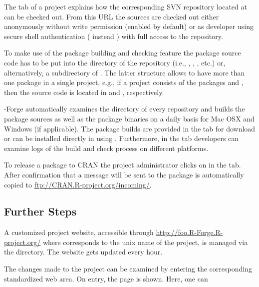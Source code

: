The  tab of a project explains how the corresponding SVN
repository located at 
can be checked out. From
this URL the sources are checked out either 
anonymously without write permission (enabled by default) or as
developer using secure shell 
authentication ( instead ) with full
access to the repository.

To make use of the package building and checking feature
the package source code has to be put into the  directory
of the repository (i.e., ,
, , etc.) or, alternatively, a 
subdirectory of . The latter structure allows to
have more than one package in a single project, e.g., if
a project consists of the packages  and , then the
source code is located in  and ,
respectively.

\R{}-Forge automatically examines the  directory of
every repository and builds the package sources as well as the package
binaries on a daily basis for Mac OSX and Windows (if applicable). The
package builds 
are provided in the  tab for download or can be
installed directly in \R{} using 
. Furthermore, in the  tab developers can examine logs of the build and check
process on different platforms. 

To release a package to CRAN the project administrator clicks on
 in the  tab. After
confirmation that a message will be sent to 
the package is automatically copied to
\url{ftp://CRAN.R-project.org/incoming/}.


\subsection{Further Steps}

A customized project website, accessible through
\url{http://foo.R-Forge.R-project.org/} where  
corresponds to the unix name of the project, is managed via the
 directory. The website gets updated every hour. 

The changes made to the project can be examined by entering the
corresponding standardized web area. On entry, the 
page is shown. Here, one can 

